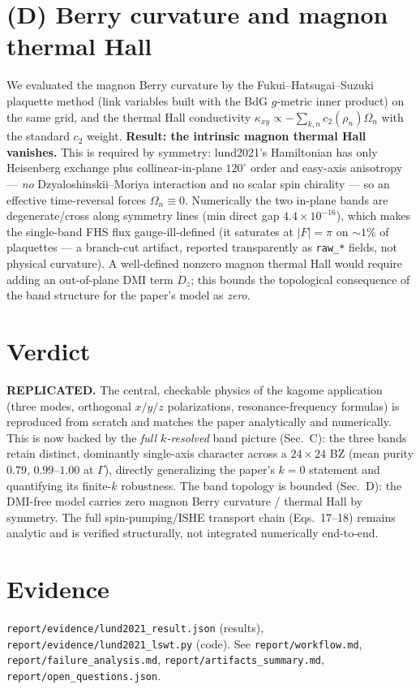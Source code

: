 \documentclass[11pt]{article}
\begin{document}
\section{(D) Berry curvature and magnon thermal Hall}
We evaluated the magnon Berry curvature by the Fukui--Hatsugai--Suzuki
plaquette method (link variables built with the BdG $g$-metric inner
product) on the same grid, and the thermal Hall conductivity
$\kappa_{xy}\propto-\sum_{k,n}c_2(\rho_n)\Omega_n$ with the standard
$c_2$ weight. \textbf{Result: the intrinsic magnon thermal Hall vanishes.}
This is required by symmetry: lund2021's Hamiltonian has only Heisenberg
exchange plus collinear-in-plane $120^\circ$ order and easy-axis anisotropy
--- \emph{no} Dzyaloshinskii--Moriya interaction and no scalar spin
chirality --- so an effective time-reversal forces $\Omega_n\equiv0$.
Numerically the two in-plane bands are degenerate/cross along symmetry lines
(min direct gap $4.4\times10^{-16}$), which makes the single-band FHS flux
gauge-ill-defined (it saturates at $|F|=\pi$ on $\sim1\%$ of plaquettes ---
a branch-cut artifact, reported transparently as \texttt{raw\_*} fields, not
physical curvature). A well-defined nonzero magnon thermal Hall would
require adding an out-of-plane DMI term $D_z$; this bounds the topological
consequence of the band structure for the paper's model as \emph{zero}.

\section{Verdict}
\textbf{REPLICATED.} The central, checkable physics of the kagome
application (three modes, orthogonal $x/y/z$ polarizations, resonance-frequency
formulas) is reproduced from scratch and matches the paper analytically and
numerically. This is now backed by the \emph{full $k$-resolved} band picture
(Sec.~C): the three bands retain distinct, dominantly single-axis character
across a $24\times24$ BZ (mean purity $0.79$, $0.99$--$1.00$ at $\Gamma$),
directly generalizing the paper's $k=0$ statement and quantifying its
finite-$k$ robustness. The band topology is bounded (Sec.~D): the DMI-free
model carries zero magnon Berry curvature / thermal Hall by symmetry. The
full spin-pumping/ISHE transport chain (Eqs.~17--18) remains analytic and is
verified structurally, not integrated numerically end-to-end.

\section{Evidence}
\texttt{report/evidence/lund2021\_result.json} (results),
\texttt{report/evidence/lund2021\_lswt.py} (code). See
\texttt{report/workflow.md}, \texttt{report/failure\_analysis.md},
\texttt{report/artifacts\_summary.md}, \texttt{report/open\_questions.json}.
\end{document}
